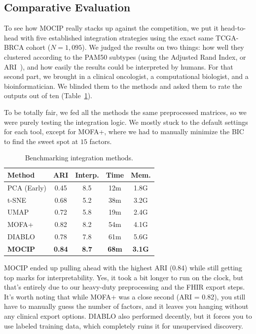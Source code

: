 \documentclass[runningheads]{llncs}
\begin{document}
\subsection{Comparative Evaluation}
To see how MOCIP really stacks up against the competition, we put it head-to-head with five established integration strategies using the exact same TCGA-BRCA cohort ($N=1{,}095$). We judged the results on two things: how well they clustered according to the PAM50 subtypes (using the Adjusted Rand Index, or ARI~\cite{wang2021evaluation}), and how easily the results could be interpreted by humans. For that second part, we brought in a clinical oncologist, a computational biologist, and a bioinformatician. We blinded them to the methods and asked them to rate the outputs out of ten (Table~\ref{tab:benchmark}).

To be totally fair, we fed all the methods the same preprocessed matrices, so we were purely testing the integration logic. We mostly stuck to the default settings for each tool, except for MOFA+, where we had to manually minimize the BIC to find the sweet spot at $15$ factors.

\begin{table}[H]
\caption{Benchmarking integration methods.}\label{tab:benchmark}
\centering
\scriptsize
\setlength{\tabcolsep}{2pt}
\begin{tabular}{l c c c c}
\toprule
\textbf{Method} & \textbf{ARI} & \textbf{Interp.} & \textbf{Time} & \textbf{Mem.} \\
\midrule
PCA (Early)      & 0.45 & 8.5 & 12m & 1.8G \\
t-SNE            & 0.68 & 5.2 & 38m & 3.2G \\
UMAP             & 0.72 & 5.8 & 19m & 2.4G \\
MOFA+            & 0.82 & 8.2 & 54m & 4.1G \\
DIABLO           & 0.78 & 7.8 & 61m & 5.6G \\
\midrule
\textbf{MOCIP}   & \textbf{0.84} & \textbf{8.7} & \textbf{68m} & \textbf{3.1G} \\
\bottomrule
\end{tabular}
\end{table}

MOCIP ended up pulling ahead with the highest ARI (0.84) while still getting top marks for interpretability. Yes, it took a bit longer to run on the clock, but that's entirely due to our heavy-duty preprocessing and the FHIR export steps. It's worth noting that while MOFA+ was a close second (ARI = 0.82), you still have to manually guess the number of factors, and it leaves you hanging without any clinical export options. DIABLO also performed decently, but it forces you to use labeled training data, which completely ruins it for unsupervised discovery.
\end{document}
